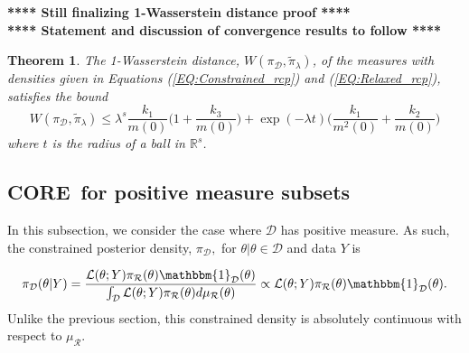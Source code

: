 \documentclass[12 point]{article}
\newcommand{\core}{\textbf{CORE}}
\newtheorem{theorem_Wasserstein_distance}{Theorem}
\begin{document}
\begin{center}
\textbf{**** Still finalizing 1-Wasserstein distance proof ****}\\
\textbf{**** Statement and discussion of convergence results to follow ****}
\end{center}





\begin{theorem_Wasserstein_distance}
The 1-Wasserstein distance, $W(\pi_\mathcal{D},\tilde{\pi}_\lambda)$, of the measures with densities given in Equations (\ref{EQ:Constrained_rcp}) and (\ref{EQ:Relaxed_rcp}), satisfies the bound
$$W(\pi_\mathcal{D},\tilde{\pi}_\lambda)\le \lambda^s \frac{k_1}{m(0)}\bigg(1+\frac{k_3}{m(0)}\bigg) + \exp(-\lambda t )\bigg(\frac{k_1}{m^2(0)}+\frac{k_2}{m(0)}\bigg)$$
where $t$ is the radius of a ball in $\mathbb{R}^s$.
\end{theorem_Wasserstein_distance}



\subsection{\core\, for positive measure subsets}

In this subsection, we consider the case where $\mathcal{D}$ has positive measure.  As such, the constrained posterior density, $\pi_\mathcal{D},$ for $\theta|\theta \in \mathcal{D}$ and data $Y$ is 

$$\pi_\mathcal{D}(\theta|Y) = \frac{\mathcal{L}(\theta; Y) \pi_\mathcal{R}(\theta)\mathbbm{1}_\mathcal{D}(\theta)}{\int_\mathcal{D} \mathcal{L}(\theta; Y) \pi_\mathcal{R}(\theta)d\mu_\mathcal{R}(\theta)}\propto \mathcal{L}(\theta; Y) \pi_\mathcal{R}(\theta)\mathbbm{1}_\mathcal{D}(\theta). $$
Unlike the previous section, this constrained density is absolutely continuous with respect to $\mu_\mathcal{R}$.  
\end{document}
